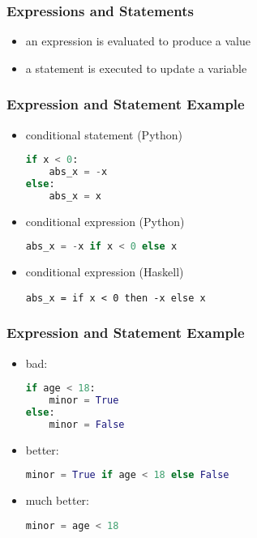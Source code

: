 \documentclass[dvipsnames]{beamer}
\theoremstyle{plain}
\begin{document}
\begin{frame}
  \frametitle{Expressions and Statements}

  \medskip
  \begin{itemize}
    \item an \alert{expression} is evaluated to produce a value

    \medskip
    \item a \alert{statement} is executed to update a variable
  \end{itemize}
\end{frame}

\begin{frame}[fragile]
  \frametitle{Expression and Statement Example}

  \begin{itemize}
    \item conditional statement (Python)
    \begin{lstlisting}[language=Python]
if x < 0:
    abs_x = -x
else:
    abs_x = x
    \end{lstlisting}

    \pause
    \medskip
    \item conditional expression (Python)
    \begin{lstlisting}[language=Python]
abs_x = -x if x < 0 else x
    \end{lstlisting}

    \pause
    \medskip
    \item conditional expression (Haskell)
    \begin{lstlisting}
abs_x = if x < 0 then -x else x
    \end{lstlisting}
  \end{itemize}
\end{frame}

\begin{frame}[fragile]
  \frametitle{Expression and Statement Example}

  \begin{itemize}
    \item bad:
    \begin{lstlisting}[language=Python, morekeywords={True, False}]
if age < 18:
    minor = True
else:
    minor = False
    \end{lstlisting}

    \pause
    \medskip
    \item better:
    \begin{lstlisting}[language=Python, morekeywords={True, False}]
minor = True if age < 18 else False
    \end{lstlisting}

    \pause
    \medskip
    \item much better:
    \begin{lstlisting}[language=Python]
minor = age < 18
    \end{lstlisting}
  \end{itemize}
\end{frame}
\end{document}
